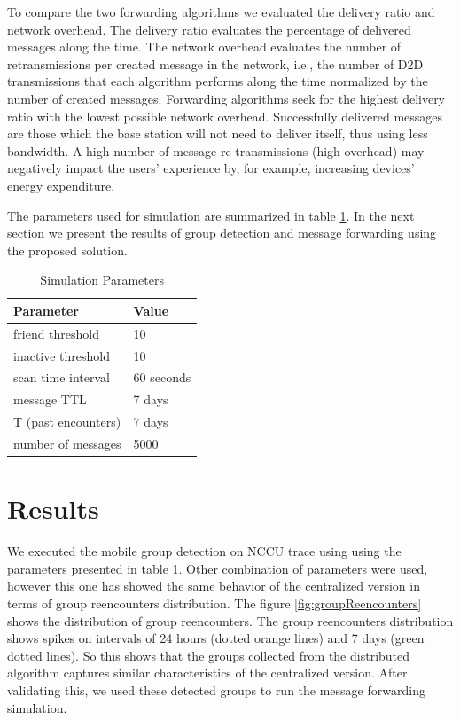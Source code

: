 To compare the two forwarding algorithms we evaluated the delivery ratio and network overhead. The delivery ratio evaluates the percentage of delivered messages along the time. The network overhead evaluates the number of retransmissions per created message in the network, i.e., the number of D2D transmissions that each algorithm performs along the time normalized by the number of created messages. Forwarding algorithms seek for the highest delivery ratio with the lowest possible network overhead. Successfully delivered messages are those which the base station will not need to deliver itself, thus using less bandwidth. A high number of message re-transmissions (high overhead) may negatively impact the users' experience by, for example, increasing devices' energy expenditure.

The parameters used for simulation are summarized in table \ref{tab:groupsNetParameters}. In the next section we present the results of group detection and message forwarding using the proposed solution.

\begin{table}[H]
	\centering
	\caption{Simulation Parameters}
	\label{tab:groupsNetParameters}
	\begin{tabular}{|l|l|}
	\hline
	\textbf{Parameter}  & \textbf{Value} \\ \hline
	friend threshold    & 10             \\ \hline
	inactive threshold  & 10             \\ \hline
	scan time interval  & 60 seconds     \\ \hline
	message TTL         & 7 days         \\ \hline
	T (past encounters) & 7 days         \\ \hline
	number of messages  & 5000           \\ \hline
	\end{tabular}
	\end{table}

\section{Results}
\label{sec:GNResults}

We executed the mobile group detection on NCCU trace using using the parameters presented in table \ref{tab:groupsNetParameters}. Other combination of parameters were used, however this one has showed the same behavior of the centralized version in terms of group reencounters distribution. The figure \ref{fig:groupReencounters} shows the distribution of group reencounters. The group reencounters distribution shows spikes on intervals of 24 hours (dotted orange lines) and 7 days (green dotted lines). So this shows that the groups collected from the distributed algorithm captures similar characteristics of the centralized version. After validating this, we used these detected groups to run the message forwarding simulation.

